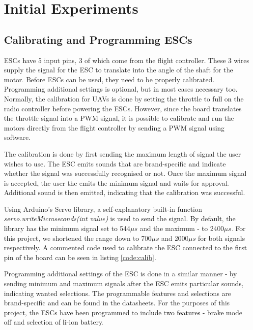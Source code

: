 \section{Initial Experiments}

\subsection{Calibrating and Programming ESCs}
ESCs have 5 input pins, 3 of which come from the flight controller. These 3 wires supply the signal for the ESC to translate into the angle of the shaft for the motor. Before ESCs can be used, they need to be properly calibrated. Programming additional settings is optional, but in most cases necessary too. Normally, the calibration for UAVs is done by setting the throttle to full on the radio controller before powering the ESCs. However, since the board translates the throttle signal into a PWM signal, it is possible to calibrate and run the motors directly from the flight controller by sending a PWM signal using software.

The calibration is done by first sending the maximum length of signal the user wishes to use. The ESC emits sounds that are brand-specific and indicate whether the signal was successfully recognised or not. Once the maximum signal is accepted, the user the emits the minimum signal and waits for approval. Additional sound is then emitted, indicating that the calibration was successful.

Using Arduino's Servo library, a self-explanatory built-in function \textit{servo.writeMicroseconds(int value)} is used to send the signal. By default, the library has the minimum signal set to 544$\mu s$ and the maximum - to 2400$\mu s$. For this project, we shortened the range down to 700$\mu s$ and 2000$\mu s$ for both signals respectively. A commented code used to calibrate the ESC connected to the first pin of the board can be seen in listing \ref{code:calib}.



Programming additional settings of the ESC is done in a similar manner - by sending minimum and maximum signals after the ESC emits particular sounds, indicating wanted selections. The programmable features and selections are brand-specific and can be found in the datasheets. For the purposes of this project, the ESCs have been programmed to include two features - brake mode off and selection of li-ion battery.

